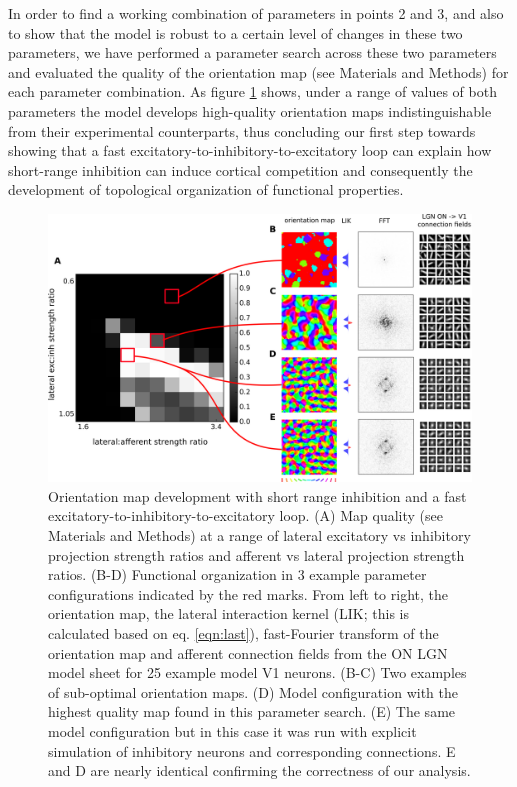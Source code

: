 \documentclass[utf8]{frontiersSCNS}
\begin{document}
In order to find a working combination of parameters in points 2 and 3, and also to show that the model is robust to a certain level of changes
in these two parameters, we have performed a parameter search across these two parameters and evaluated the quality of the orientation map (see Materials and Methods) for each 
parameter combination. As figure \ref{fig:figure1} shows, under a range of values of both parameters the model develops high-quality orientation maps indistinguishable
from their experimental counterparts, thus concluding our first step towards showing that a fast excitatory-to-inhibitory-to-excitatory loop can explain 
how short-range inhibition can induce cortical competition and consequently the development of topological organization of functional properties.


\begin{figure}[htpb!] 
\centering
\includegraphics[width=16cm]{./SVG/Figure1/figure1.png}
\caption{Orientation map development with short range inhibition and a fast excitatory-to-inhibitory-to-excitatory loop. (A) Map quality (see Materials and Methods) at a range of 
lateral excitatory vs inhibitory projection strength ratios and afferent vs lateral projection strength ratios. (B-D) Functional organization in 3 example parameter configurations 
indicated by the red marks. From left to right, the orientation map, the lateral interaction kernel (LIK; this is calculated based on eq. \ref{eqn:last}), fast-Fourier transform of the orientation map and afferent connection fields from the ON LGN model sheet for 25 example model V1 neurons. 
(B-C) Two examples of sub-optimal orientation maps. (D) Model configuration with the highest quality map found in this parameter search. 
(E) The same model configuration but in this case it was run with explicit simulation of inhibitory neurons and corresponding connections. E and D are nearly identical confirming the correctness of our analysis.
}
\label{fig:figure1}
\end{figure} 
\end{document}
